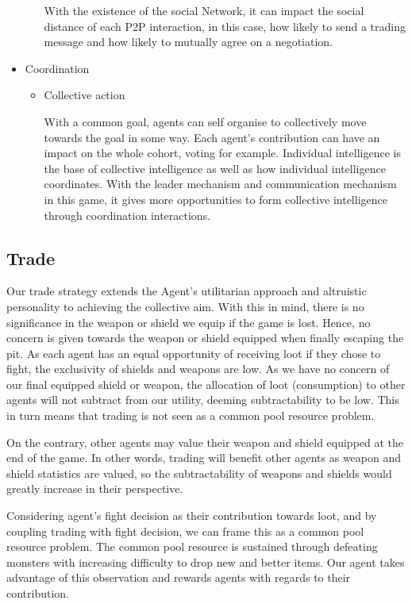 \begin{itemize}
\begin{itemize}
                    With the existence of the social Network, it can impact the social distance of each P2P interaction, in this case, how likely to send a trading message and how likely to mutually agree on a negotiation.
          \end{itemize}
    \item Coordination
          \begin{itemize}
              \item Collective action

                    With a common goal, agents can self organise to collectively move towards the goal in some way. Each agent's contribution can have an impact on the whole cohort, voting for example. Individual intelligence is the base of collective intelligence as well as how individual intelligence coordinates. With the leader mechanism and communication mechanism in this game, it gives more opportunities to form collective intelligence through coordination interactions.
          \end{itemize}
\end{itemize}

\subsection{Trade}

Our trade strategy extends the Agent's utilitarian approach and altruistic personality to achieving the collective aim. With this in mind, there is no significance in the weapon or shield we equip if the game is lost. Hence, no concern is given towards the weapon or shield equipped when finally escaping the pit. As each agent has an equal opportunity of receiving loot if they chose to fight, the exclusivity of shields and weapons are low. As we have no concern of our final equipped shield or weapon, the allocation of loot (consumption) to other agents will not subtract from our utility, deeming subtractability to be low. This in turn means that trading is not seen as a common pool resource problem.

On the contrary, other agents may value their weapon and shield equipped at the end of the game. In other words, trading will benefit other agents as weapon and shield statistics are valued, so the subtractability of weapons and shields would greatly increase in their perspective.

Considering agent's fight decision as their contribution towards loot, and by coupling trading with fight decision, we can frame this as a common pool resource problem. The common pool resource is sustained through defeating monsters with increasing difficulty to drop new and better items. Our agent takes advantage of this observation and rewards agents with regards to their contribution.


